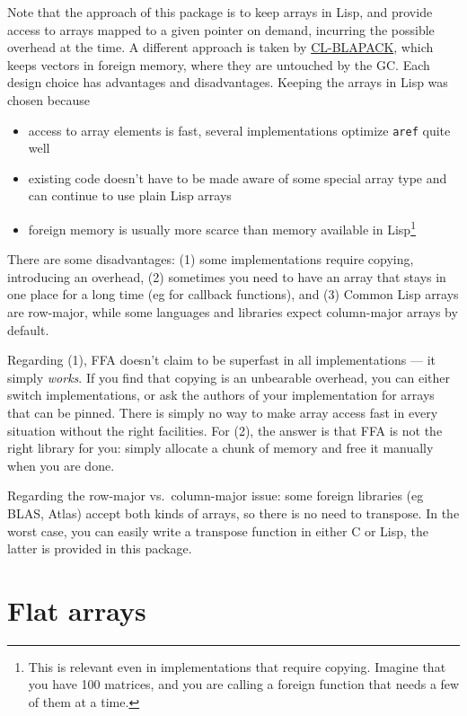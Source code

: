\documentclass[12pt,a4paper,dvipdfm]{article}
\begin{document}
Note that the approach of this package is to keep arrays in Lisp, and
provide access to arrays mapped to a given pointer on demand,
incurring the possible overhead at the time.  A different approach is
taken by
\href{http://middleangle.com/rif/derifatives/Home/21/cl-blapack-alpha-release}{CL-BLAPACK},
which keeps vectors in foreign memory, where they are untouched by the
GC.  Each design choice has advantages and disadvantages.  Keeping the
arrays in Lisp was chosen because
\begin{itemize}
\item access to array elements is fast, several implementations
  optimize \lstinline!aref! quite well
\item existing code doesn't have to be made aware of some special
  array type and can continue to use plain Lisp arrays
\item foreign memory is usually more scarce than memory available in
  Lisp\footnote{This is relevant even in implementations that require
    copying.  Imagine that you have 100 matrices, and you are calling
    a foreign function that needs a few of them at a time.}
\end{itemize}

There are some disadvantages: (1) some implementations require
copying, introducing an overhead, (2) sometimes you need to have an
array that stays in one place for a long time (eg for callback
functions), and (3) Common Lisp arrays are row-major, while some
languages and libraries expect column-major arrays by default.

Regarding (1), FFA doesn't claim to be superfast in all
implementations --- it simply \emph{works}.  If you find that copying
is an unbearable overhead, you can either switch implementations, or
ask the authors of your implementation for arrays that can be pinned.
There is simply no way to make array access fast in every situation
without the right facilities.  For (2), the answer is that FFA is not
the right library for you: simply allocate a chunk of memory and free
it manually when you are done.

Regarding the row-major vs.~column-major issue: some foreign libraries
(eg BLAS, Atlas) accept both kinds of arrays, so there is no need to
transpose.  In the worst case, you can easily write a transpose
function in either C or Lisp, the latter is provided in this package.

\section{Flat arrays}
\label{sec:flat-arrays}
\end{document}
